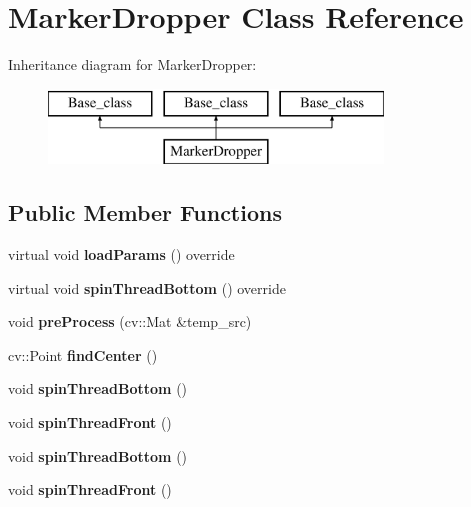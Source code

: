 \hypertarget{classMarkerDropper}{}\section{Marker\+Dropper Class Reference}
\label{classMarkerDropper}
Inheritance diagram for Marker\+Dropper\+:\begin{figure}[H]
\begin{center}
\leavevmode
\includegraphics[height=2.000000cm]{classMarkerDropper}
\end{center}
\end{figure}
\subsection*{Public Member Functions}
\begin{DoxyCompactItemize}
\item 
\mbox{\label{classMarkerDropper_a60c7e60403cdcbd33d50c9bae3309b65}} 
virtual void {\bfseries load\+Params} () override
\item 
\mbox{\label{classMarkerDropper_abb62612d590e6ea50503d489cb1b41aa}} 
virtual void {\bfseries spin\+Thread\+Bottom} () override
\item 
\mbox{\label{classMarkerDropper_aa9bf73390dc56ebe4827a6c27167fe9b}} 
void {\bfseries pre\+Process} (cv\+::\+Mat \&temp\+\_\+src)
\item 
\mbox{\label{classMarkerDropper_aff48227552a1737e8dd8591b61293233}} 
cv\+::\+Point {\bfseries find\+Center} ()
\item 
\mbox{\label{classMarkerDropper_ab2707be25d4882e94838ec4a9ff2aba8}} 
void {\bfseries spin\+Thread\+Bottom} ()
\item 
\mbox{\label{classMarkerDropper_a1b9b487b4fc201977a35e35bdd083667}} 
void {\bfseries spin\+Thread\+Front} ()
\item 
\mbox{\label{classMarkerDropper_ab2707be25d4882e94838ec4a9ff2aba8}} 
void {\bfseries spin\+Thread\+Bottom} ()
\item 
\mbox{\label{classMarkerDropper_a1b9b487b4fc201977a35e35bdd083667}} 
void {\bfseries spin\+Thread\+Front} ()
\end{DoxyCompactItemize}
